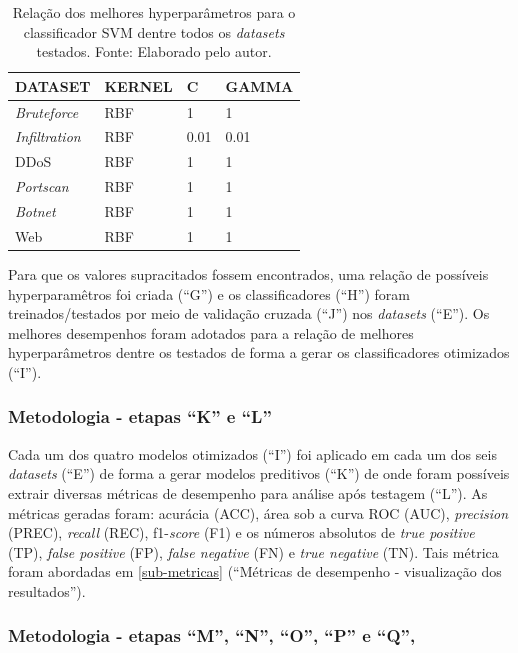 \begin{longtable}{l|l|l|l}
\caption{Relação dos melhores hyperparâmetros para o classificador SVM dentre todos os \textit{datasets} testados. Fonte: Elaborado pelo autor.}

\label{tab:hyper_svm}

\hline


\textbf{DATASET} & \textbf{KERNEL} & \textbf{C} & \textbf{GAMMA}  \\ \hline \hline

\textit{Bruteforce}   & RBF & 1 & 1\\ \hline
\textit{Infiltration} & RBF & 0.01 & 0.01\\ \hline
DDoS         &  RBF & 1 & 1\\ \hline
\textit{Portscan}     & RBF & 1 & 1 \\ \hline
\textit{Botnet}       & RBF & 1 & 1 \\ \hline
Web          & RBF & 1 & 1 \\ \hline

\end{longtable}

Para que os valores supracitados fossem encontrados, uma relação de possíveis hyperparamêtros foi criada (``G'') e os classificadores (``H'') foram treinados/testados por meio de validação cruzada (``J'') nos \textit{datasets} (``E''). Os melhores desempenhos foram adotados para a relação de melhores hyperparâmetros dentre os testados de forma a gerar os classificadores otimizados (``I''). 


\subsubsection*{Metodologia - etapas ``K'' e ``L''}

Cada um dos quatro modelos otimizados (``I'') foi aplicado em cada um dos seis \textit{datasets} (``E'') de forma a gerar modelos preditivos (``K'') de onde foram possíveis extrair diversas métricas de desempenho para análise após testagem (``L''). As métricas geradas foram: acurácia (ACC), área sob a curva ROC (AUC), \textit{precision} (PREC), \textit{recall} (REC), f1-\textit{score} (F1) e os números absolutos de \textit{true positive} (TP), \textit{false positive} (FP), \textit{false negative} (FN) e \textit{true negative} (TN). Tais métrica foram abordadas em \ref{sub-metricas} (``Métricas de desempenho - visualização dos resultados'').


\subsubsection*{Metodologia - etapas ``M'', ``N'', ``O'', ``P'' e ``Q'', }

